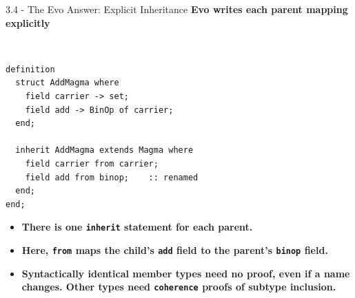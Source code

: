\documentclass[aspectratio=169,11pt]{beamer}
\newcommand{\statusbadge}[2]{\colorbox{#1}{\textcolor{white}{\strut\scriptsize\sffamily\bfseries #2}}}
\newcommand{\badgeSpec}{\statusbadge{green!35!black}{specification example}}
\begin{document}
\begin{frame}[fragile,t]{3.4 - The Evo Answer: Explicit Inheritance}
\smallskip
\textbf{\textcolor{blue!55!black}{\textbf{Evo writes each parent mapping explicitly}}}~\badgeSpec
\begin{lstlisting}[language={mizar},basicstyle=\ttfamily\footnotesize]
definition
  struct AddMagma where
    field carrier -> set;
    field add -> BinOp of carrier;
  end;

  inherit AddMagma extends Magma where
    field carrier from carrier;
    field add from binop;    :: renamed
  end;
end;
\end{lstlisting}
\begin{itemize}
\setlength{\itemsep}{1pt}
\setlength{\parsep}{0pt}
\setlength{\parskip}{0pt}
\item \textcolor{blue!55!black}{\textbf{There is one \texttt{inherit} statement for each parent.}}
\item \textcolor{blue!55!black}{\textbf{Here, \texttt{from} maps the child's \texttt{add} field to the parent's \texttt{binop} field.}}
\item \textcolor{blue!55!black}{\textbf{Syntactically identical member types need no proof, even if a name changes. Other types need \texttt{coherence} proofs of subtype inclusion.}}
\end{itemize}
\end{frame}
\end{document}
